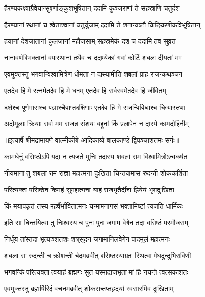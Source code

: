 \twolineshloka
{हैरण्यकक्ष्याग्रैवेयान्सुवर्णाङ्कुशभूषितान्}
{ददामि कुञ्जराणां ते सहस्राणि चतुर्दश} %

\twolineshloka
{हैरण्यानां रथानां च श्वेताश्वानां चतुर्युजाम्}
{ददामि ते शतान्यष्टौ किङ्किणीकविभूषितान्} %

\twolineshloka
{हयानां देशजातानां कुलजानां महौजसाम्}
{सहस्रमेकं दश च ददामि तव सुव्रत} %

\twolineshloka
{नानावर्णविभक्तानां वयःस्थानां तथैव च}
{ददाम्येकां गवां कोटिं शबला दीयतां मम} %

\twolineshloka
{एवमुक्तस्तु भगवान्विश्वामित्रेण धीमता}
{न दास्यामीति शबलां प्राह राजन्कथञ्चन} %

\twolineshloka
{एतदेव हि मे रत्नमेतदेव हि मे धनम्}
{एतदेव हि सर्वस्वमेतदेव हि जीवितम्} %

\twolineshloka
{दर्शश्च पूर्णमासश्च यज्ञाश्चैवाप्तदक्षिणाः}
{एतदेव हि मे राजन्विविधाश्च क्रियास्तथा} %

\twolineshloka
{अदोमूलाः क्रियाः सर्वा मम राजन्न संशयः}
{बहूनां किं प्रलापेन न दास्ये कामदोहिनीम्} %


{॥इत्यार्षे श्रीमद्रामायणे वाल्मीकीये आदिकाव्ये बालकाण्डे द्विपञ्चाशत्तमः सर्गः॥}


\twolineshloka
{कामधेनुं वसिष्ठोऽपि यदा न त्यजते मुनिः}
{तदास्य शबलां राम विश्वामित्रोऽन्वकर्षत} %

\twolineshloka
{नीयमाना तु शबला राम राज्ञा महात्मना}
{दुःखिता चिन्तयामास रुदन्ती शोककर्शिता} %

\twolineshloka
{परित्यक्ता वसिष्ठेन किमहं सुमहात्मना}
{याहं राजभृतैर्दीना ह्रियेयं भृशदुःखिता} %

\twolineshloka
{किं मयापकृतं तस्य महर्षेर्भावितात्मनः}
{यन्मामनागसं भक्तामिष्टां त्यजति धार्मिकः} %

\twolineshloka
{इति सा चिन्तयित्वा तु निःश्वस्य च पुनः पुनः}
{जगाम वेगेन तदा वसिष्ठं परमौजसम्} %

\twolineshloka
{निर्धूय तांस्तदा भृत्याञ्शतशः शत्रुसूदन}
{जगामानिलवेगेन पादमूलं महात्मनः} %

\twolineshloka
{शबला सा रुदन्ती च क्रोशन्ती चेदमब्रवीत्}
{वसिष्ठस्याग्रतः स्थित्वा मेघदुन्दुभिराविणी} %

\twolineshloka
{भगवन्किं परित्यक्ता त्वयाहं ब्रह्मणः सुत}
{यस्माद्राजभृता मां हि नयन्ते त्वत्सकाशतः} %

\twolineshloka
{एवमुक्तस्तु ब्रह्मर्षिरिदं वचनमब्रवीत्}
{शोकसन्तप्तहृदयां स्वसारमिव दुःखिताम्} %

